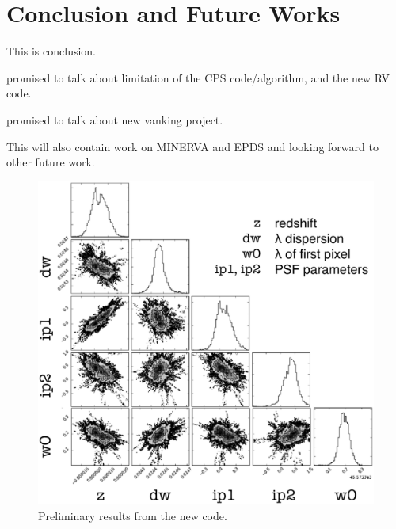 \chapter{Conclusion and Future Works}\label{chap:conclusion}

This is conclusion.

promised to talk about limitation of the CPS code/algorithm, and the
new RV code.

promised to talk about new vanking project.

This will also contain work on MINERVA and EPDS and looking forward to
other future work.



\begin{figure}
\centering
\includegraphics[scale=0.3]{conclusion/mcmcplot-labeled.eps}
\caption{Preliminary results from the new code.
\label{conclusion:fig:mcmc}}
\end{figure}
